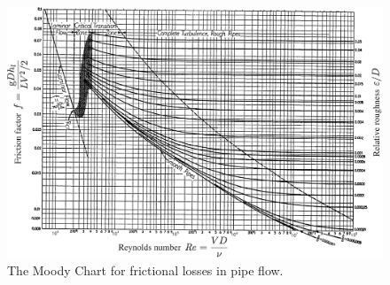 \documentclass[a4paper,11pt]{article} \pagestyle{plain}
\begin{document}
\newpage
\begin{figure}
\begin{center}
\includegraphics[angle=90,height=0.9\textheight]{MoodyChartReLabelled.eps}
\end{center}
\caption{The Moody Chart for frictional losses in pipe flow.}
\label{fig.moody}
\end{figure}


\end{document}
